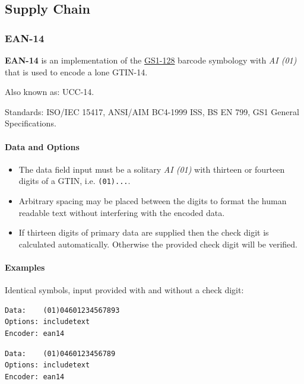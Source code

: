 \hypertarget{supply-chain}{%
\subsection{Supply Chain}\label{supply-chain}}

\hypertarget{ean-14}{%
\subsubsection{EAN-14}\label{ean-14}}

\textbf{EAN-14} is an implementation of the
\protect\hyperlink{gs1-128}{GS1-128} barcode symbology with \emph{AI
(01)} that is used to encode a lone GTIN-14.

Also known as: UCC-14.

Standards: ISO/IEC 15417, ANSI/AIM BC4-1999 ISS, BS EN 799, GS1 General
Specifications.

\hypertarget{data-and-options-25}{%
\paragraph{Data and Options}\label{data-and-options-25}}

\begin{itemize}
\tightlist
\item
  The data field input must be a solitary \emph{AI (01)} with thirteen
  or fourteen digits of a GTIN, i.e. \texttt{(01)...}.
\item
  Arbitrary spacing may be placed between the digits to format the human
  readable text without interfering with the encoded data.
\item
  If thirteen digits of primary data are supplied then the check digit
  is calculated automatically. Otherwise the provided check digit will
  be verified.
\end{itemize}

\hypertarget{examples-20}{%
\paragraph{Examples}\label{examples-20}}

Identical symbols, input provided with and without a check digit:

\begin{verbatim}
Data:    (01)04601234567893
Options: includetext
Encoder: ean14
\end{verbatim}

\begin{verbatim}
Data:    (01)0460123456789
Options: includetext
Encoder: ean14
\end{verbatim}

